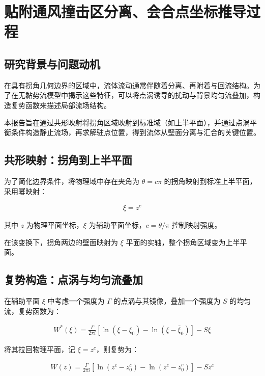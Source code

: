 \section{贴附通风撞击区分离、会合点坐标推导过程}


\subsection{研究背景与问题动机}

在具有拐角几何边界的区域中，流体流动通常伴随着分离、再附着与回流结构。为了在无黏势流模型中揭示这些特征，可以将点涡诱导的扰动与背景均匀流叠加，构造复势函数来描述局部流场结构。

本报告旨在通过共形映射将拐角区域映射到标准域（如上半平面），并通过点涡平衡条件构造静止流场，再求解驻点位置，得到流体从壁面分离与汇合的关键位置。


\subsection{共形映射：拐角到上半平面}

为了简化边界条件，将物理域中存在夹角为 $\theta = c\pi$ 的拐角映射到标准上半平面，采用幂映射：

\begin{align}
    \xi = z^c
\end{align}

其中 $z$ 为物理平面坐标，$\xi$ 为辅助平面坐标，$c = \theta/\pi$ 控制映射强度。

在该变换下，拐角两边的壁面映射为 $\xi$ 平面的实轴，整个拐角区域变为上半平面。



\subsection{复势构造：点涡与均匀流叠加}

在辅助平面 $\xi$ 中考虑一个强度为 $\Gamma$ 的点涡与其镜像，叠加一个强度为 $S$ 的均匀流，复势函数为：

\begin{align}
    W^*(\xi) = \frac{\Gamma}{2\pi i} \left[ \ln(\xi - \xi_0) - \ln(\xi - \bar{\xi}_0) \right] - S \xi
\end{align}

将其拉回物理平面，记 $\xi = z^c$，则复势为：

\begin{align}
    W(z) = \frac{\Gamma}{2\pi i} \left[ \ln(z^c - z_0^c) - \ln(z^c - \bar{z}_0^c) \right] - S z^c
\end{align}

